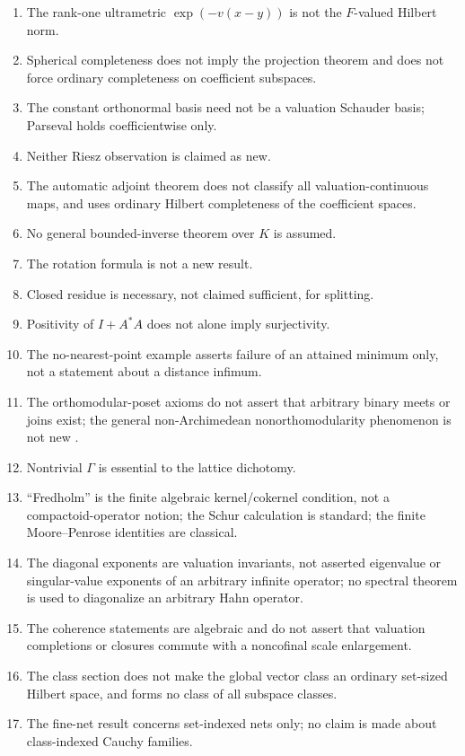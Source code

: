 \documentclass[11pt,letterpaper]{article}
\numberwithin{equation}{section}
\theoremstyle{definition}
\theoremstyle{remark}
\newcommand{\F}{F}
\newcommand{\K}{K}
\begin{document}
\begin{enumerate}[leftmargin=*,widest=00,label=03.\arabic*]
\item The rank-one ultrametric $\exp(-v(x-y))$ is not the $\F$-valued Hilbert
norm.
\item Spherical completeness does not imply the projection theorem and does
not force ordinary completeness on coefficient subspaces.
\item The constant orthonormal basis need not be a valuation Schauder basis;
Parseval holds coefficientwise only.
\item Neither Riesz observation is claimed as new.
\item The automatic adjoint theorem does not classify all valuation-continuous
maps, and uses ordinary Hilbert completeness of the coefficient spaces.
\item No general bounded-inverse theorem over $\K$ is assumed.
\item The rotation formula is not a new result.
\item Closed residue is necessary, not claimed sufficient, for splitting.
\item Positivity of $I+A^*A$ does not alone imply surjectivity.
\item The no-nearest-point example asserts failure of an attained minimum
only, not a statement about a distance infimum.
\item The orthomodular-poset axioms do not assert that arbitrary binary meets
or joins exist; the general non-Archimedean nonorthomodularity phenomenon is
not new \cite{AN}.
\item Nontrivial $\Gamma$ is essential to the lattice dichotomy.
\item ``Fredholm'' is the finite algebraic kernel/cokernel condition, not a
compactoid-operator notion; the Schur calculation is standard; the finite
Moore--Penrose identities are classical.
\item The diagonal exponents are valuation invariants, not asserted
eigenvalue or singular-value exponents of an arbitrary infinite operator; no
spectral theorem is used to diagonalize an arbitrary Hahn operator.
\item The coherence statements are algebraic and do not assert that
valuation completions or closures commute with a noncofinal scale
enlargement.
\item The class section does not make the global vector class an ordinary
set-sized Hilbert space, and forms no class of all subspace classes.
\item The fine-net result concerns set-indexed nets only; no claim is made
about class-indexed Cauchy families.

\end{enumerate}
\end{document}
